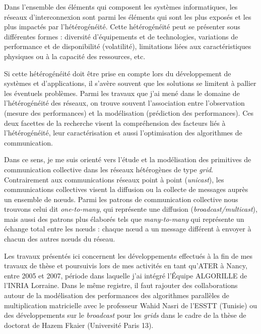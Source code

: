 \begin{resume}
Dans l'ensemble des éléments qui composent les systèmes informatiques, les réseaux d'interconnexion sont parmi les éléments qui sont les plus exposés et les plus impactés par l'hétérogénéité. Cette hétérogénéité peut se présenter sous différentes formes : diversité d'équipements et de technologies, variations de performance et de disponibilité (volatilité), limitations liées aux caractéristiques physiques ou à la capacité des ressources, etc. 

Si cette hétérogénéité doit être prise en compte lors du développement de systèmes et d'applications, il s'avère souvent que les solutions se limitent à pallier les éventuels problèmes. Parmi les travaux que j'ai mené dans le domaine de l'hétérogénéité des réseaux, on trouve souvent l'association entre l'observation (mesure des performances) et la modélisation (prédiction des performances). Ces deux facettes de la recherche visent la compréhension des facteurs liés à l'hétérogénéité, leur caractérisation et aussi l'optimisation des algorithmes de communication.

Dans ce sens, je me suis orienté vers l'étude et la modélisation des primitives de communication collective dans les réseaux hétérogènes de type \textit{grid}. Contrairement aux communications réseaux point à point (\textit{unicast}), les communications collectives visent la diffusion ou  la collecte de messages auprès un ensemble de n{\oe}uds. Parmi les patrons de communication collective nous trouvons celui dit \textit{one-to-many}, qui représente une diffusion (\textit{broadcast/multicast}), mais aussi des patrons plus élaborés tels que \textit{many-to-many} qui représente un échange total entre les n{\oe}uds : chaque n{\oe}ud a un message différent à envoyer à chacun des autres n{\oe}uds du réseau. 

Les travaux présentés ici concernent les développements effectués à la fin de mes travaux de thèse et poursuivis lors de mes activités en tant qu’ATER à Nancy, entre 2005 et 2007, période dans laquelle j'ai intégré l'Équipe ALGORILLE de l'INRIA Lorraine. Dans le même registre, il faut rajouter des collaborations autour de la modélisation des performances des algorithmes parallèles de multiplication matricielle avec le professeur Wahid Nasri de l'ESSTT (Tunisie) ou des développements sur le \textit{broadcast} pour les \textit{grids} dans le cadre de la thèse de doctorat de Hazem Fkaier (Université Paris 13).



\end{resume}
